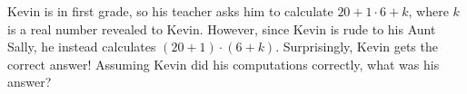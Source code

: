 Kevin is in first grade, so his teacher asks him to calculate $20+1\cdot 6+k$, where $k$ is a real number revealed to Kevin. However, since Kevin is rude to his Aunt Sally, he instead calculates $(20+1)\cdot (6+k)$. Surprisingly, Kevin gets the correct answer! Assuming Kevin did his computations correctly, what was his answer?
